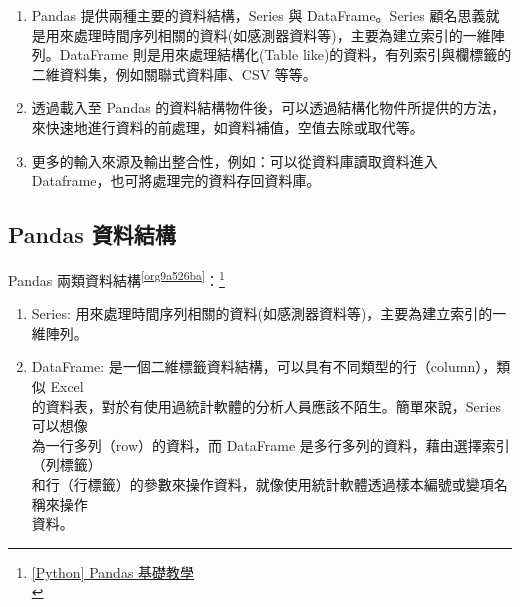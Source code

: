 \documentclass[a4paper,12pt]{article}
\begin{document}
\begin{enumerate}
\begin{itemize}
\begin{enumerate}
\item Pandas 提供兩種主要的資料結構，Series 與 DataFrame。Series 顧名思義就是用來處理時間序列相關的資料(如感測器資料等)，主要為建立索引的一維陣列。DataFrame 則是用來處理結構化(Table like)的資料，有列索引與欄標籤的二維資料集，例如關聯式資料庫、CSV 等等。\\
\item 透過載入至 Pandas 的資料結構物件後，可以透過結構化物件所提供的方法，來快速地進行資料的前處理，如資料補值，空值去除或取代等。\\
\item 更多的輸入來源及輸出整合性，例如：可以從資料庫讀取資料進入 Dataframe，也可將處理完的資料存回資料庫。\\
\end{enumerate}
\end{itemize}
\end{enumerate}
\subsection{Pandas 資料結構}
\label{sec:org9fae0d3}
Pandas 兩類資料結構\textsuperscript{\ref{org9a526ba}}：\footnote{\href{https://oranwind.org/python-pandas-ji-chu-jiao-xue/}{[Python] Pandas 基礎教學}\\}\\
\begin{enumerate}
\item Series: 用來處理時間序列相關的資料(如感測器資料等)，主要為建立索引的一維陣列。\\
\item DataFrame: 是一個二維標籤資料結構，可以具有不同類型的行（column），類似 Excel\\
的資料表，對於有使用過統計軟體的分析人員應該不陌生。簡單來說，Series 可以想像\\
為一行多列（row）的資料，而 DataFrame 是多行多列的資料，藉由選擇索引（列標籤）\\
和行（行標籤）的參數來操作資料，就像使用統計軟體透過樣本編號或變項名稱來操作\\
資料。\\
\end{enumerate}
\end{document}
